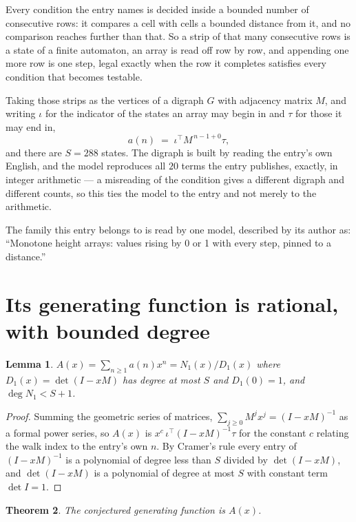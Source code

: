 \documentclass[11pt,a4paper]{article}
\theoremstyle{plain}
\newtheorem{theorem}{Theorem}
\newtheorem{lemma}[theorem]{Lemma}
\theoremstyle{definition}
\begin{document}
Every condition the entry names is decided inside a bounded number of consecutive rows: it
compares a cell with cells a bounded distance from it, and no comparison reaches further than
that. So a strip of that many consecutive rows is a state of a finite automaton, an array is
read off row by row, and appending one more row is one step, legal exactly when the row it
completes satisfies every condition that becomes testable.

Taking those strips as the vertices of a digraph $G$ with adjacency matrix $M$, and writing
$\iota$ for the indicator of the states an array may begin in and $\tau$ for those it may end
in,
\[
a(n)\;=\;\iota^{\!\top}M^{\,n-1+0}\tau ,
\]
and there are $S=288$ states. The digraph is built by reading the entry's own English, and the
model reproduces all $20$ terms the entry publishes, exactly, in integer arithmetic --- a
misreading of the condition gives a different digraph and different counts, so this ties the
model to the entry and not merely to the arithmetic.

The family this entry belongs to is read by one model, described by its author as: ``Monotone height arrays: values rising by 0 or 1 with every step, pinned to a distance.''


\section{Its generating function is rational, with bounded degree}

\begin{lemma}\label{lem:rat}
$A(x)=\sum_{n\ge1}a(n)x^n=N_1(x)/D_1(x)$ where $D_1(x)=\det(I-xM)$ has degree at most
$S$ and $D_1(0)=1$, and $\deg N_1<S+1$.
\end{lemma}

\begin{proof}
Summing the geometric series of matrices, $\sum_{j\ge0}M^jx^j=(I-xM)^{-1}$ as a formal
power series, so $A(x)$ is $x^{c}\,\iota^{\!\top}(I-xM)^{-1}\tau$ for the constant $c$
relating the walk index to the entry's own $n$. By Cramer's rule every entry of
$(I-xM)^{-1}$ is a polynomial of degree less than $S$ divided by $\det(I-xM)$, and
$\det(I-xM)$ is a polynomial of degree at most $S$ with constant term $\det I=1$.
\end{proof}

\begin{theorem}
The conjectured generating function is $A(x)$.
\end{theorem}
\end{document}
